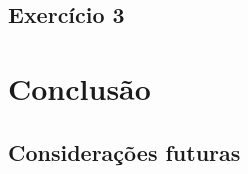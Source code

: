 \documentclass[a4paper,10pt]{report}
\begin{document}
\section{Exercício 3}

\chapter{Conclusão}

\section{Considerações futuras}
\end{document}
